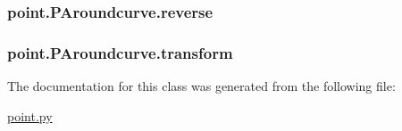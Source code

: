 \subsubsection[{reverse}]{\setlength{\rightskip}{0pt plus 5cm}point.\+P\+Aroundcurve.\+reverse}\label{classpoint_1_1_p_aroundcurve_a3241c3671e0fa3d11b165e8ca2801997}
\hypertarget{classpoint_1_1_p_aroundcurve_a1a8bd2e8bba44444912fb13e79f53c1a}{}
\subsubsection[{transform}]{\setlength{\rightskip}{0pt plus 5cm}point.\+P\+Aroundcurve.\+transform}\label{classpoint_1_1_p_aroundcurve_a1a8bd2e8bba44444912fb13e79f53c1a}


The documentation for this class was generated from the following file\+:\begin{DoxyCompactItemize}
\item 
\hyperlink{point_8py}{point.\+py}\end{DoxyCompactItemize}
